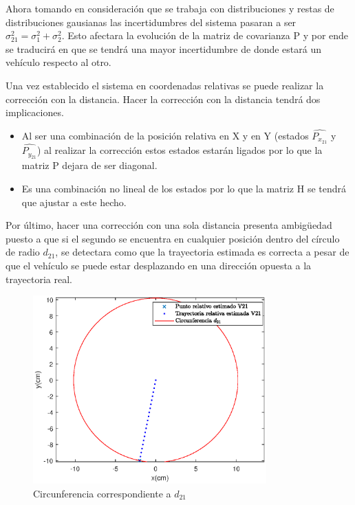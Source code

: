 Ahora tomando en consideración que se trabaja con distribuciones y restas de distribuciones gausianas las incertidumbres del sistema pasaran a ser $\sigma_{21}^2=\sigma_{1}^2+\sigma_{2}^2$. Esto afectara la evolución de la matriz de covarianza P y por ende se traducirá en que se tendrá una mayor incertidumbre de donde estará un vehículo respecto al otro. 
\par
Una vez establecido el sistema en coordenadas relativas se puede realizar la corrección con la distancia. Hacer la corrección con la distancia tendrá dos implicaciones.
\begin{itemize}
	\item Al ser una combinación de la posición relativa en X y en Y (estados $\hat{P_{x_{21}}}$ y $\hat{P_{y_{21}}}$) al realizar la corrección estos estados estarán ligados por lo que la matriz P dejara de ser diagonal. 
	\item Es una combinación no lineal de los estados por lo que la matriz H se tendrá que ajustar a este hecho. 
\end{itemize}
Por último, hacer una corrección con una sola distancia presenta ambigüedad puesto a que si el segundo se encuentra en cualquier posición dentro del círculo de radio $d_{21}$, se detectara como que la trayectoria estimada es correcta a pesar de que el vehículo se puede estar desplazando en una dirección opuesta a la trayectoria real. 

\begin{figure}[htb]
\centering
\includegraphics[width=0.8\textwidth]{figures/RadioAmbiguedad.eps}
\caption{Circunferencia correspondiente a $d_{21}$} 
\label{fig:Ambiguedad_1d}
\end{figure}
\par 

